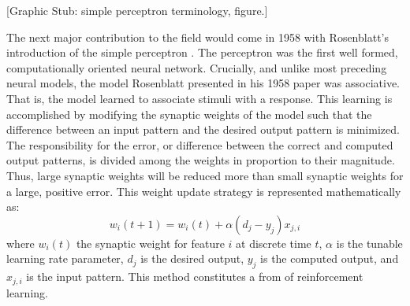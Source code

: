 \documentclass[11pt]{afthesis}
\begin{document}
	
	[Graphic Stub: simple perceptron terminology, figure.]
	
	The next major contribution to the field would come in 1958 with Rosenblatt's introduction of the simple perceptron \cite{rosenblatt1958perceptron}. The perceptron was the first \cite{anderson1988neurocomputing} well formed, computationally oriented neural network. Crucially, and unlike most preceding neural models, the model Rosenblatt presented in his  1958 paper was associative. That is, the model learned to associate stimuli with a response. This learning is accomplished by modifying the synaptic weights of the model such that the difference between an input pattern and the desired output pattern is minimized. The responsibility for the error, or difference between the correct and computed output patterns, is divided among the weights in proportion to their magnitude. Thus, large synaptic weights will be reduced more than small synaptic weights for a large, positive error. This weight update strategy is represented mathematically as: \begin{equation} 
	w_i(t+1) = w_i(t) + \alpha(d_j - y_j)x_{j,i}
	\end{equation} where \begin{math} w_i(t) \end{math} the synaptic weight for feature \begin{math} i \end{math} at discrete time \begin{math} t \end{math}, \begin{math} \alpha \end{math} is the tunable learning rate parameter, \begin{math} d_j \end{math} is the desired output, \begin{math} y_j \end{math} is the computed output, and \begin{math} x_{j,i} \end{math} is the input pattern. This method constitutes a from of reinforcement learning.
	
\end{document}
